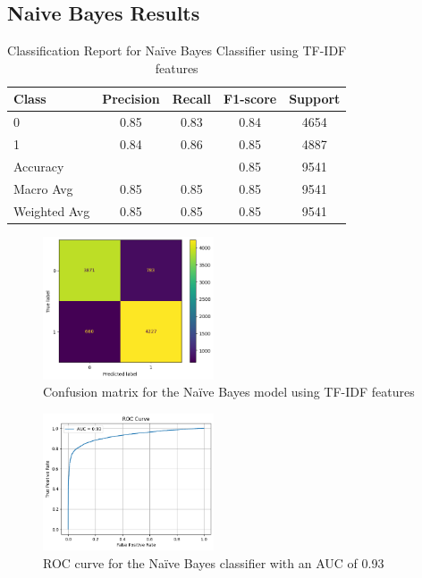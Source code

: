 \subsection{Naive Bayes Results}

\begin{table}[H]
\centering
\caption{Classification Report for Naïve Bayes Classifier using TF-IDF features}
\label{tab:nb_classification_report}
\begin{tabular}{lcccc}
\toprule
Class        & Precision & Recall & F1-score & Support \\
\midrule
0            & 0.85      & 0.83   & 0.84     & 4654    \\
1            & 0.84      & 0.86   & 0.85     & 4887    \\
\midrule
Accuracy     &           &        & 0.85     & 9541    \\
Macro Avg    & 0.85      & 0.85   & 0.85     & 9541    \\
Weighted Avg & 0.85      & 0.85   & 0.85     & 9541    \\
\bottomrule
\end{tabular}
\end{table}

\begin{figure}[H]
    \centering
    \includegraphics[width=0.45\textwidth]{images/confusion_matrix_nb.png}
    \caption{Confusion matrix for the Naïve Bayes model using TF-IDF features}
    \label{fig:confusion_nb}
\end{figure}

\begin{figure}[H]
    \centering
    \includegraphics[width=0.45\textwidth]{images/roc_curve_nb.png}
    \caption{ROC curve for the Naïve Bayes classifier with an AUC of 0.93}
    \label{fig:roc_nb}
\end{figure}


